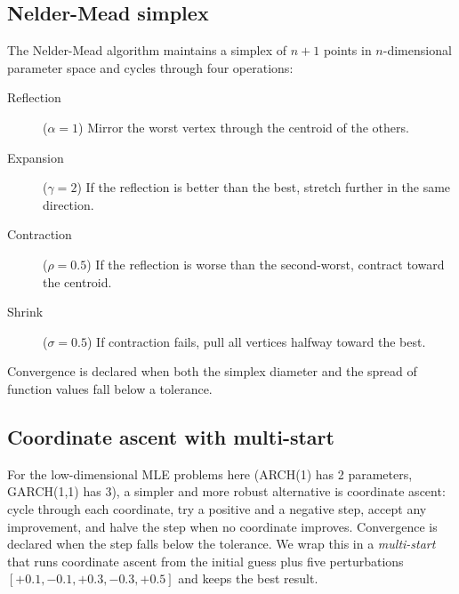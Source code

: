 \subsection{Nelder-Mead simplex}

The Nelder-Mead algorithm maintains a simplex of $n+1$ points in
$n$-dimensional parameter space and cycles through four operations:
\begin{description}
    \item[Reflection] ($\alpha = 1$) Mirror the worst vertex through the
      centroid of the others.
    \item[Expansion] ($\gamma = 2$) If the reflection is better than the
      best, stretch further in the same direction.
    \item[Contraction] ($\rho = 0.5$) If the reflection is worse than the
      second-worst, contract toward the centroid.
    \item[Shrink] ($\sigma = 0.5$) If contraction fails, pull all vertices
      halfway toward the best.
\end{description}
Convergence is declared when both the simplex diameter and the spread of
function values fall below a tolerance.

\subsection{Coordinate ascent with multi-start}


For the low-dimensional MLE problems here (ARCH(1) has 2 parameters,
GARCH(1,1) has 3), a simpler and more robust alternative is coordinate
ascent: cycle through each coordinate, try a positive and a negative step,
accept any improvement, and halve the step when no coordinate improves.
Convergence is declared when the step falls below the tolerance. We wrap
this in a \emph{multi-start} that runs coordinate ascent from the initial
guess plus five perturbations $[+0.1, -0.1, +0.3, -0.3, +0.5]$ and keeps the
best result.

